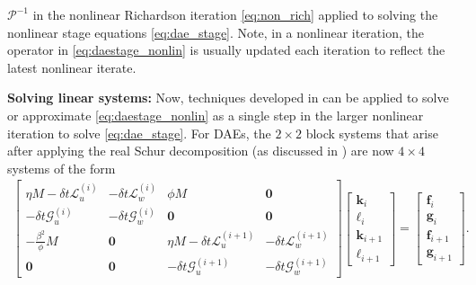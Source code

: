 \documentclass[review]{siamart}
\begin{document}
$\mathcal{P}^{-1}$ in the nonlinear Richardson iteration \eqref{eq:non_rich}
applied to solving the nonlinear stage equations \eqref{eq:dae_stage}. Note,
in a nonlinear iteration, the operator in \eqref{eq:daestage_nonlin} is
usually updated each iteration to reflect the latest nonlinear iterate.


\textbf{Solving linear systems:}
Now, techniques developed in  can be applied to solve
or approximate \eqref{eq:daestage_nonlin} as a single step in the larger
nonlinear iteration to solve \eqref{eq:dae_stage}. For DAEs, the $2\times 2$
block systems that arise after applying the real Schur decomposition (as
discussed in ) are now $4\times 4$ systems of
the form
%
\begin{align}\label{eq:dae_block}
\begin{bmatrix} \eta M - \delta t\mathcal{L}_{u}^{(i)} & -\delta t\mathcal{L}_{w}^{(i)}
		& \phi M & \mathbf{0} \\
	-\delta t\mathcal{G}_{u}^{(i)} & -\delta t\mathcal{G}_w^{(i)}
		& \mathbf{0} & \mathbf{0} \\
	-\tfrac{\beta^2}{\phi}M & \mathbf{0} & \eta M - \delta t\mathcal{L}_{u}^{(i+1)} &
		-\delta t\mathcal{L}_{w}^{(i+1)} \\
	\mathbf{0} & \mathbf{0} & -\delta t\mathcal{G}_{u}^{(i+1)} &
		-\delta t\mathcal{G}_w^{(i+1)} \end{bmatrix}
	\begin{bmatrix} \mathbf{k}_{i} \\ \boldsymbol{\ell}_{i} \\
		 \mathbf{k}_{i+1} \\ \boldsymbol{\ell}_{i+1} \end{bmatrix}
	= 	\begin{bmatrix} \mathbf{f}_{i} \\ \mathbf{g}_{i} \\
		 \mathbf{f}_{i+1} \\ \mathbf{g}_{i+1} \end{bmatrix}.
\end{align}
\end{document}
